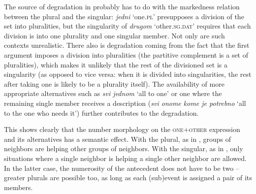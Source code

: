 \documentclass[output=paper,colorlinks,citecolor=brown]{langscibook}
\begin{document}
\label{Susedi3-b} 

\label{Susedi3-c} 

 \label{Susedi3-d} 
\z \z 

\noindent The source of degradation in  probably has to do with the markedness relation between the plural and the singular: \textit{jedni} `one.\textsc{pl}' presupposes a division of the set into pluralities, but the singularity of \textit{drugom} `other.\textsc{sg.dat}' requires that each division is into one plurality and one singular member. Not only are such contexts unrealistic. There also is degradation coming from the fact that the first argument imposes a division into pluralities (the partitive complement is a set of pluralities), which makes it unlikely that the rest of the divisioned set is a singularity (as opposed to vice versa: when it is divided into singularities, the rest after taking one is likely to be a plurality itself). The availability of more appropriate alternatives such as \textit{svi jednom} `all to one' or one where the remaining single member receives a description (\textit{svi onome kome je potrebno} `all to the one who needs it') further contributes to the degradation.

This shows clearly that the number morphology on the \textsc{one$+$other} expression and its alternatives has a semantic effect. With the plural, as in , groups of neighbors are helping other groups of neighbors. With the singular, as in , only situations where a single neighbor is helping a single other neighbor are allowed. In the latter case, the numerosity of the antecedent does not have to be two -- greater plurals are possible too, as long as each (sub)event is assigned a pair of its members. 
\end{document}
